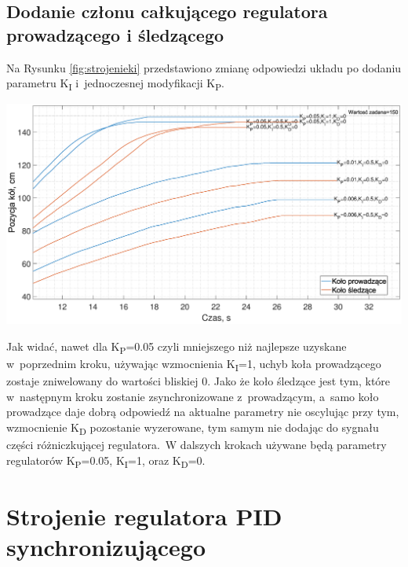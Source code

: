 \subsection*{Dodanie członu całkującego regulatora prowadzącego i śledzącego}
Na Rysunku \ref{fig:strojenieki} przedstawiono zmianę odpowiedzi układu po dodaniu parametru K\textsubscript{I} i~jednoczesnej modyfikacji K\textsubscript{P}.
\begin{center}
    \includegraphics[scale=0.32]{images/strojenieKi.eps}
    \label{fig:strojenieki}
\end{center}

Jak widać, nawet dla K\textsubscript{P}=0.05 czyli mniejszego niż najlepsze uzyskane w~poprzednim kroku, używając wzmocnienia K\textsubscript{I}=1, uchyb koła prowadzącego zostaje zniwelowany do wartości bliskiej 0. Jako że koło śledzące jest tym, które w~następnym kroku zostanie zsynchronizowane z~prowadzącym, a~samo koło prowadzące daje dobrą odpowiedź na aktualne parametry nie oscylując przy tym, wzmocnienie K\textsubscript{D} pozostanie wyzerowane, tym samym nie dodając do sygnału części różniczkującej regulatora.~W dalszych krokach używane będą parametry regulatorów K\textsubscript{P}=0.05, K\textsubscript{I}=1, oraz K\textsubscript{D}=0.

\section{Strojenie regulatora PID synchronizującego}
